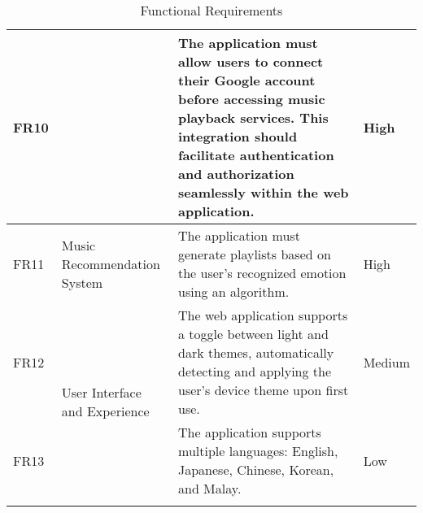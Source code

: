 \begin{longtable}{ |m{1cm}|m{3.5cm}|m{7cm}|m{1.5cm}| }
    \cline{1-1} \cline{3-4}
    FR10 &  & The application must allow users to connect their Google account before accessing music playback services. This integration should facilitate authentication and authorization seamlessly within the web application. & High \\
    \hline
    FR11 & Music Recommendation System & The application must generate playlists based on the user's recognized emotion using an algorithm. & High \\
    \hline
    FR12 & \multirow{2}{=}{User Interface and Experience} & The web application supports a toggle between light and dark themes, automatically detecting and applying the user's device theme upon first use. & Medium \\
    \cline{1-1} \cline{3-4}
    FR13 &  & The application supports multiple languages: English, Japanese, Chinese, Korean, and Malay. & Low \\
    \hline
    \caption{Functional Requirements} \\
\end{longtable}
\pagebreak
